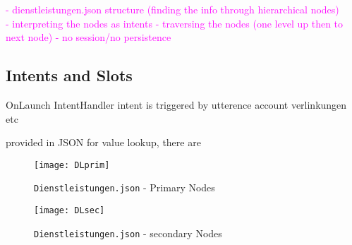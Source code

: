 \textcolor{magenta}{
	- dienstleistungen.json structure (finding the info through hierarchical nodes)\\
	- interpreting the nodes as intents
	- traversing the nodes (one level up then to next node)
	- no session/no persistence
}

\subsection{Intents and Slots} 

OnLaunch
IntentHandler
intent is triggered by utterence
account verlinkungen etc

%

provided in JSON for value lookup, there are

\begin{figure}[h!]
	\caption{\lstinline|Dienstleistungen.json|  - Primary Nodes}
	\texttt{[image: DLprim]}
\end{figure}

\begin{figure}[h]
	\caption{\lstinline|Dienstleistungen.json| - secondary Nodes}
	\texttt{[image: DLsec]}
\end{figure}

